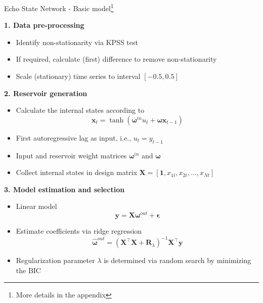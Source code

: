 \documentclass[aspectratio=169]{beamer}
\begin{document}
\begin{frame}[t]{Echo State Network - Basic model\footnote{More details in the appendix}}
    \begin{minipage}[t]{0.33\textwidth}
        \vspace{0pt}
        \textbf{1. Data pre-processing}
        \begin{itemize}
            \item Identify non-stationarity via KPSS test
			\item If required, calculate (first) difference to remove non-stationarity
			\item Scale (stationary) time series to interval $[-0.5, 0.5]$
        \end{itemize}
    \end{minipage}%
    \hfill
    \begin{minipage}[t]{0.33\textwidth}
        \vspace{0pt}
        \textbf{2. Reservoir generation}
        \begin{itemize}
            \item Calculate the internal states according to
				\begin{equation*}
					\mathbf{x}_{t} = \tanh \left( {\boldsymbol{\omega}^{in}} u_{t} + \boldsymbol{\omega} \mathbf{x}_{t-1} \right)
				\end{equation*}
			\item First autoregressive lag as input, i.e., $u_{t} = y_{t-1}$
			\item Input and reservoir weight matrices $\boldsymbol{\omega}^{in}$ and $\boldsymbol{\omega}$
			\item Collect internal states in design matrix $\mathbf{X} = [\mathbf{1},  x_{1t}, x_{2t}, ..., x_{Nt}]$
        \end{itemize}
    \end{minipage}
    \hfill
    \begin{minipage}[t]{0.33\textwidth}
        \vspace{0pt}
        \textbf{3. Model estimation and selection}
        \begin{itemize}
            \item Linear model
            	\begin{equation*}
            	\mathbf{y} = \mathbf{X} \boldsymbol{\omega}^{out} + \boldsymbol{\epsilon}
				\end{equation*}
			\item Estimate coefficients via ridge regression
				\begin{equation*}
				\boldsymbol{\hat{\omega}}^{out} = (\mathbf{X}^\top \mathbf{X} + \mathbf{R}_{\lambda})^{-1}\mathbf{X}^\top\mathbf{y}
				\end{equation*}
			\item Regularization parameter $\lambda$ is determined via random search by minimizing the BIC
        \end{itemize}
    \end{minipage}
\end{frame}
\end{document}
